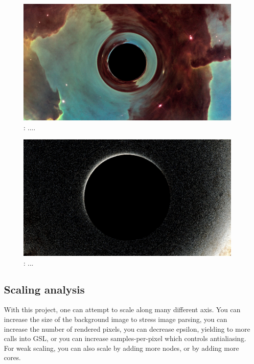 \begin{figure}[h]
  \centering
  \includegraphics[width=\linewidth]{eagle_render}
  \caption{: ....}
    \label{fig:eagle}
\end{figure}

\begin{figure}[h]
  \centering
  \includegraphics[width=\linewidth]{starry_render}
  \caption{: ...}
    \label{fig:starry}
\end{figure}




\subsection{Scaling analysis}

With this project, one can attempt to scale along many different axis. You can increase the size of the background image to stress image parsing, you can increase the number of rendered pixels, you can decrease epsilon, yielding to more calls into GSL, or you can increase samples-per-pixel which controls antialiasing. For weak scaling, you can also scale by adding more nodes, or by adding more cores. 

